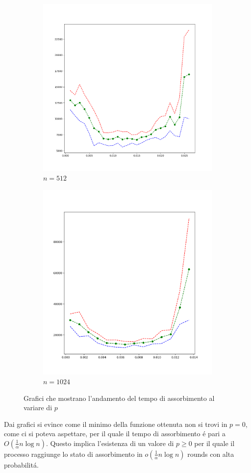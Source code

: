 \documentclass[../Tesi.tex]{subfiles}
\begin{document}
\begin{figure}[H]
\centering
    \begin{subfigure}[b]{0.45\textwidth}
      \centering
      \includegraphics[width=0.8\linewidth]{imgs/ER_p_variation/n=512 a=025.png}
      \caption*{$n=512$}
      \label{fig:sub1}
    \end{subfigure}%
    \begin{subfigure}[b]{0.45\textwidth}
      \centering
      \includegraphics[width=0.8\linewidth]{imgs/ER_p_variation/n=1024 a=025.png}
      \caption*{$n=1024$}
      \label{fig:sub2}
    \end{subfigure}
\caption*{Grafici che mostrano l'andamento del tempo di assorbimento al variare di $p$}
\end{figure}
Dai grafici si evince come il minimo della funzione ottenuta non si trovi in $p=0$, come ci si poteva aspettare, per il quale il tempo di assorbimento \'e pari a $O(\frac{1}{\alpha}n\log{}n)$.
Questo implica l'esistenza di un valore di $p \geq 0$ per il quale il processo raggiunge lo stato di assorbimento in $o(\frac{1}{\alpha}n\log{}n)$ rounds con alta probabilit\'a. 
\end{document}
